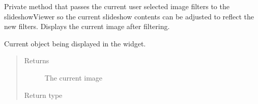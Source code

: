 \documentclass[letterpaper,10pt,english]{sphinxmanual}
\begin{document}
\begin{fulllineitems}
\begin{fulllineitems}
\begin{quote}
\begin{description}
\end{description}\end{quote}

\end{fulllineitems}


\begin{fulllineitems}
\label{\detokenize{polo.widgets:polo.widgets.slideshow_inspector.slideshowInspector._submit_filters}}
Private method that passes the current user selected
image filters to the slideshowViewer so the current
slideshow contents can be adjusted to reflect the
new filters. Displays the current image after filtering.

\end{fulllineitems}


\begin{fulllineitems}
\label{\detokenize{polo.widgets:polo.widgets.slideshow_inspector.slideshowInspector.current_image}}
Current {\hyperref[\detokenize{polo.crystallography:polo.crystallography.image.Image}]{}} object being displayed in the 
widget.
\begin{quote}\begin{description}
\item[{Returns}] \leavevmode
The current image

\item[{Return type}] \leavevmode
{\hyperref[\detokenize{polo.crystallography:polo.crystallography.image.Image}]{}}

\end{description}\end{quote}

\end{fulllineitems}



\end{fulllineitems}
\end{document}
